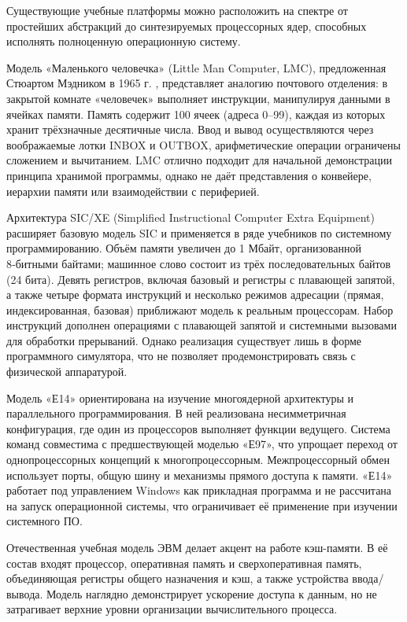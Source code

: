 Существующие учебные платформы можно расположить на спектре от простейших абстракций до синтезируемых процессорных ядер, способных исполнять полноценную операционную систему.

Модель «Маленького человечка» (Little Man Computer, LMC), предложенная Стюартом Мэдником в 1965 г. \cite{LMC}, представляет аналогию почтового отделения: в закрытой комнате «человечек» выполняет инструкции, манипулируя данными в ячейках памяти. Память содержит 100 ячеек (адреса 0–99), каждая из которых хранит трёхзначные десятичные числа. Ввод и вывод осуществляются через воображаемые лотки INBOX и OUTBOX, арифметические операции ограничены сложением и вычитанием. LMC отлично подходит для начальной демонстрации принципа хранимой программы, однако не даёт представления о конвейере, иерархии памяти или взаимодействии с периферией.

Архитектура SIC/XE (Simplified Instructional Computer Extra Equipment) \cite{SICXE} расширяет базовую модель SIC и применяется в ряде учебников по системному программированию. Объём памяти увеличен до 1 Мбайт, организованной 8‑битными байтами; машинное слово состоит из трёх последовательных байтов (24 бита). Девять регистров, включая базовый и регистры с плавающей запятой, а также четыре формата инструкций и несколько режимов адресации (прямая, индексированная, базовая) приближают модель к реальным процессорам. Набор инструкций дополнен операциями с плавающей запятой и системными вызовами для обработки прерываний. Однако реализация существует лишь в форме программного симулятора, что не позволяет продемонстрировать связь с физической аппаратурой.

Модель «Е14» \cite{E14} ориентирована на изучение многоядерной архитектуры и параллельного программирования. В ней реализована несимметричная конфигурация, где один из процессоров выполняет функции ведущего. Система команд совместима с предшествующей моделью «Е97», что упрощает переход от однопроцессорных концепций к многопроцессорным. Межпроцессорный обмен использует порты, общую шину и механизмы прямого доступа к памяти. «Е14» работает под управлением Windows как прикладная программа и не рассчитана на запуск операционной системы, что ограничивает её применение при изучении системного ПО.

Отечественная учебная модель ЭВМ \cite{ourcomputer} делает акцент на работе кэш-памяти. В её состав входят процессор, оперативная память и сверхоперативная память, объединяющая регистры общего назначения и кэш, а также устройства ввода/вывода. Модель наглядно демонстрирует ускорение доступа к данным, но не затрагивает верхние уровни организации вычислительного процесса.

